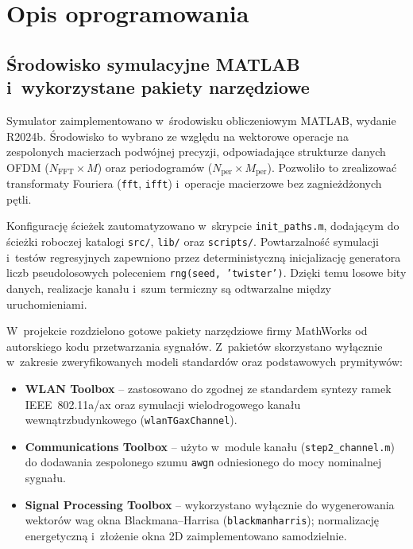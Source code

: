 \section{Opis oprogramowania}
\label{sec:radar_implementation}


\subsection{Środowisko symulacyjne MATLAB i~wykorzystane pakiety narzędziowe}
\label{subsec:matlab_environment_toolboxes}

Symulator zaimplementowano w~środowisku obliczeniowym MATLAB, wydanie R2024b. Środowisko to wybrano ze względu na wektorowe operacje na zespolonych macierzach podwójnej precyzji, odpowiadające strukturze danych OFDM ($N_{\mathrm{FFT}} \times M$) oraz periodogramów ($N_{\mathrm{per}} \times M_{\mathrm{per}}$). Pozwoliło to zrealizować transformaty Fouriera (\texttt{fft}, \texttt{ifft}) i~operacje macierzowe bez zagnieżdżonych pętli.

Konfigurację ścieżek zautomatyzowano w~skrypcie \texttt{init\_paths.m}, dodającym do ścieżki roboczej katalogi \texttt{src/}, \texttt{lib/} oraz \texttt{scripts/}. Powtarzalność symulacji i~testów regresyjnych zapewniono przez deterministyczną inicjalizację generatora liczb pseudolosowych poleceniem \texttt{rng(seed, 'twister')}. Dzięki temu losowe bity danych, realizacje kanału i~szum termiczny są odtwarzalne między uruchomieniami.

W~projekcie rozdzielono gotowe pakiety narzędziowe firmy MathWorks od autorskiego kodu przetwarzania sygnałów. Z~pakietów skorzystano wyłącznie w~zakresie zweryfikowanych modeli standardów oraz podstawowych prymitywów:
\begin{itemize}
    \item \textbf{WLAN Toolbox} -- zastosowano do zgodnej ze standardem syntezy ramek IEEE~802.11a/ax oraz symulacji wielodrogowego kanału wewnątrzbudynkowego (\texttt{wlanTGaxChannel}).
    \item \textbf{Communications Toolbox} -- użyto w~module kanału (\texttt{step2\_channel.m}) do dodawania zespolonego szumu \texttt{awgn} odniesionego do mocy nominalnej sygnału.
    \item \textbf{Signal Processing Toolbox} -- wykorzystano wyłącznie do wygenerowania wektorów wag okna Blackmana--Harrisa (\texttt{blackmanharris}); normalizację energetyczną i~złożenie okna 2D zaimplementowano samodzielnie.
\end{itemize}

